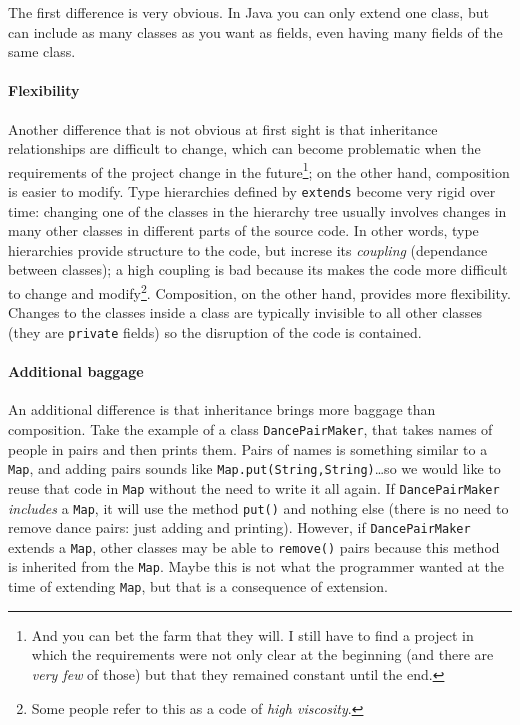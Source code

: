 The first difference is very obvious. In Java you can only extend one
class, but can include as many classes as you want as fields, even
having many fields of the same class. 

\paragraph{Flexibility }
\label{sec:flexibility-}

Another difference that is not obvious at first sight is that 
inheritance relationships are difficult to change, which can 
become problematic when the requirements
of the project change in the future\footnote{And you can bet the farm
  that they will. I still have to find a project in which the
  requirements were not only clear at the beginning (and there are
  \emph{very few} of those) but that they remained constant until the end.}; 
on the other hand, composition is
easier to modify. Type hierarchies defined by \verb+extends+ become
very rigid over time: changing one of the classes in the hierarchy
tree usually involves changes in many other classes in different parts
of the source code. In other words, type hierarchies provide structure
to the code, but increse its \emph{coupling} (dependance between
classes); a high coupling is bad because its makes the code more
difficult to change and modify\footnote{Some people refer to this as a
code of \emph{high viscosity}. }. 
Composition, on
the other hand, provides more flexibility. Changes to the classes
inside a class are typically invisible to all other classes (they are
\verb+private+ fields) so the disruption of the code is contained. 

\paragraph{Additional baggage}
\label{sec:additional-baggage}

An additional difference is that inheritance brings more baggage than
composition. Take the example of a class \verb+DancePairMaker+, that
takes names of people in pairs and then prints them. Pairs of names
is something similar to a \verb+Map+, and adding pairs sounds like
\verb+Map.put(String,String)+\ldots so we would like to reuse that
code in \verb+Map+ without the need to write it all again. 
If \verb+DancePairMaker+ \emph{includes} a
\verb+Map+, it will use the method \verb+put()+ and nothing
else (there is no need to remove dance pairs: just adding and
printing). 
However, if \verb+DancePairMaker+ extends a \verb+Map+, other
classes may be able to \verb+remove()+ pairs because this method is
inherited from the \verb+Map+. 
Maybe this is not what the programmer wanted at the time of extending
\verb+Map+, but that is a consequence of extension. 

